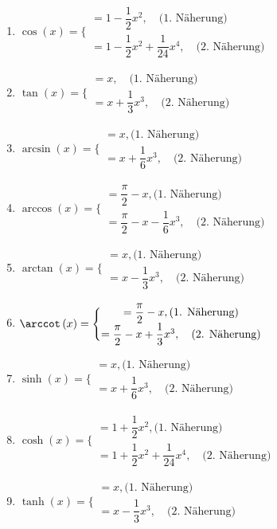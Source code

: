 \begin{enumerate}[$(a)$]
\item $\cos\left(x\right)=\Bigg\{\begin{matrix}=1-\dfrac{1}{2}x^2,\quad \text{(1. Näherung)}\\=1-\dfrac{1}{2}x^2+\dfrac{1}{24}x^4,\quad \text{(2. Näherung)}\end{matrix}$
\item $\tan\left(x\right)=\Bigg\{\begin{matrix}=x,\quad \text{(1. Näherung)}\\=x+\dfrac{1}{3}x^3,\quad \text{(2. Näherung)}\end{matrix}$
\item $\arcsin\left(x\right)=\Bigg\{\begin{matrix}=x,\text{(1. Näherung)}\\=x+\dfrac{1}{6}x^3,\quad \text{(2. Näherung)}\end{matrix}$
\item $\arccos\left(x\right)=\Bigg\{\begin{matrix}=\dfrac{\pi}{2}-x,\text{(1. Näherung)}\\=\dfrac{\pi}{2}-x-\dfrac{1}{6}x^3,\quad \text{(2. Näherung)}\end{matrix}$
\item $\arctan\left(x\right)=\Bigg\{\begin{matrix}=x,\text{(1. Näherung)}\\=x-\dfrac{1}{3}x^3,\quad \text{(2. Näherung)}\end{matrix}$
\item $\arccot\left(x\right)=\Bigg\{\begin{matrix}=\dfrac{\pi}{2}-x,\text{(1. Näherung)}\\=\dfrac{\pi}{2}-x+\dfrac{1}{3}x^3,\quad \text{(2. Näherung)}\end{matrix}$
\item $\sinh\left(x\right)=\Bigg\{\begin{matrix}=x,\text{(1. Näherung)}\\=x+\dfrac{1}{6}x^3,\quad \text{(2. Näherung)}\end{matrix}$
\item $\cosh\left(x\right)=\Bigg\{\begin{matrix}=1+\dfrac{1}{2}x^2,\text{(1. Näherung)}\\=1+\dfrac{1}{2}x^2+\dfrac{1}{24}x^4,\quad \text{(2. Näherung)}\end{matrix}$
\item $\tanh\left(x\right)=\Bigg\{\begin{matrix}=x,\text{(1. Näherung)}\\=x-\dfrac{1}{3}x^3,\quad \text{(2. Näherung)}\end{matrix}$

\end{enumerate}
